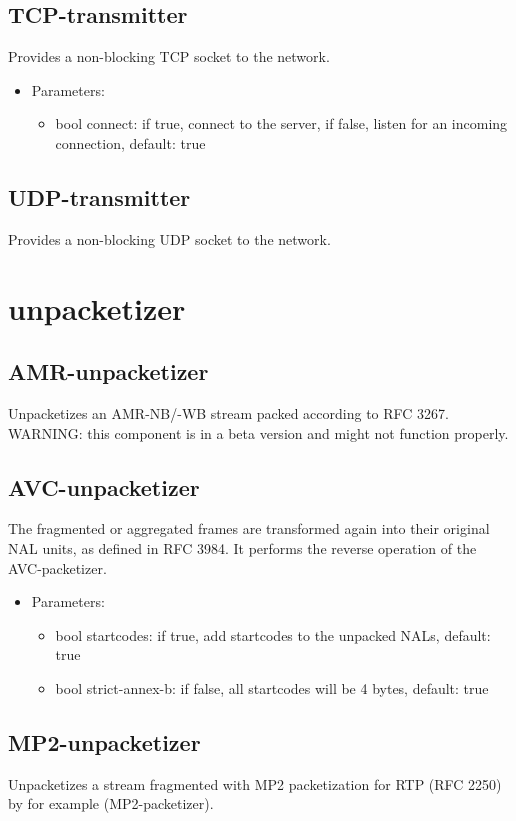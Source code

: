 \subsection{TCP-transmitter}
Provides a non-blocking TCP socket to the network.
\begin{itemize}
\item Parameters:
\begin{itemize}
\item bool connect: if true, connect to the server, if false, listen for an incoming connection, default: true
\end{itemize}
\end{itemize}
\subsection{UDP-transmitter}
Provides a non-blocking UDP socket to the network.
\newpage
\section{unpacketizer}

\subsection{AMR-unpacketizer}
Unpacketizes an AMR-NB/-WB stream packed according to RFC 3267.
\newline WARNING: this component is in a beta version and might not function properly.\subsection{AVC-unpacketizer}
The fragmented or aggregated frames are transformed again into their original NAL units, as defined in RFC 3984. It performs the reverse operation of the AVC-packetizer.
\begin{itemize}
\item Parameters:
\begin{itemize}
\item bool startcodes: if true, add startcodes to the unpacked NALs, default: true
\item bool strict-annex-b: if false, all startcodes will be 4 bytes, default: true
\end{itemize}
\end{itemize}
\subsection{MP2-unpacketizer}
Unpacketizes a stream fragmented with MP2 packetization for RTP (RFC 2250) by for example (MP2-packetizer).
